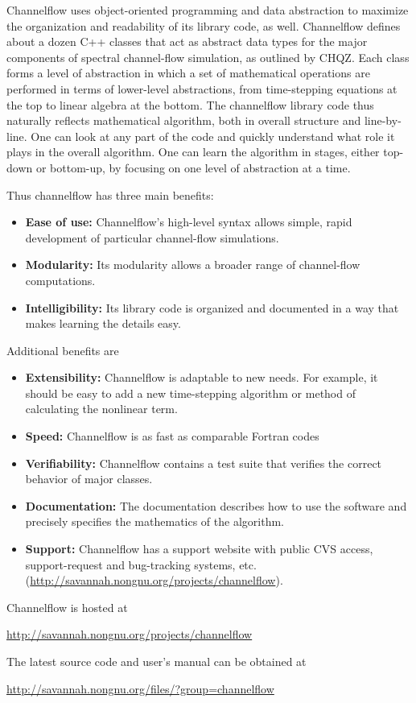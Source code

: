 \documentclass{article}[12pt]
\begin{document}
Channelflow uses object-oriented programming and data abstraction to
maximize the organization and readability of its library code, as
well. Channelflow defines about a dozen C++ classes that act as
abstract data types for the major components of spectral channel-flow
simulation, as outlined by CHQZ. Each class forms a level of
abstraction in which a set of mathematical operations are performed in
terms of lower-level abstractions, from time-stepping equations at the
top to linear algebra at the bottom. The channelflow library code thus
naturally reflects mathematical algorithm, both in overall structure
and line-by-line. One can look at any part of the code and quickly 
understand what role it plays in the overall algorithm. One can learn 
the algorithm in stages, either top-down or bottom-up, by focusing 
on one level of abstraction at a time. 

Thus channelflow has three main benefits: 
\begin{itemize} 
\item {\bf Ease of use:} Channelflow's high-level syntax allows 
simple, rapid development of particular channel-flow simulations.
\item {\bf Modularity:} Its modularity allows a broader range of 
channel-flow computations.
\item {\bf Intelligibility:} Its library code is organized and 
documented in a way that makes learning the details easy.
\end{itemize}
Additional benefits are
\begin{itemize} 
\item {\bf Extensibility:} Channelflow is adaptable to new needs. For 
example, it should be easy to add a new time-stepping algorithm or 
method of calculating the nonlinear term. 
\item {\bf Speed:} Channelflow is as fast as comparable Fortran codes
\item {\bf Verifiability:} Channelflow contains a test suite 
that verifies the correct behavior of major classes.
\item {\bf Documentation:} The documentation describes how to use 
the software and precisely specifies the mathematics of the algorithm.
\item {\bf Support:} Channelflow has a support website 
with public CVS access, support-request and bug-tracking systems, etc.
(\url{http://savannah.nongnu.org/projects/channelflow}).
\end{itemize}


Channelflow is hosted at 
\begin{center}
\url{http://savannah.nongnu.org/projects/channelflow}
\end{center}

The latest source code and user's manual can be obtained at
\begin{center}
\url{http://savannah.nongnu.org/files/?group=channelflow}
\end{center}
\end{document}
